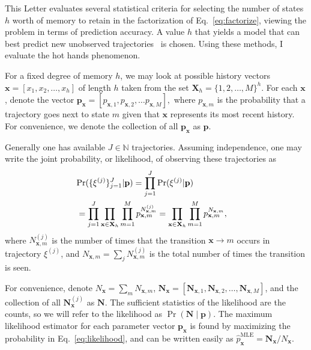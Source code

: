 \documentclass{IOS-Book-Article}
\newcommand{\bN}{\mathbf{N}}
\newcommand{\bx}{\mathbf{x}}
\newcommand{\bp}{\mathbf{p}}
\begin{document}
This Letter evaluates several statistical criteria for selecting the number of states $h$ worth of memory to retain in the factorization of Eq.~\ref{eq:factorize}, viewing the problem in terms of prediction accuracy. 
A value $h$ that yields a model that can best predict new unobserved trajectories~\cite{claeskens2008model} is chosen. Using these methods, I evaluate the hot hands phenomenon.

 For a fixed degree of memory $h$,
we may look at possible history vectors $\bx = [x_1,x_2,\ldots,x_h]$ of length $h$ taken from the set $\mathbf{X}_h = \{1,2,\ldots,M \}^h$. For each $\bx$, denote the vector $\mathbf{p}_{\bx} = [p_{\bx,1},p_{\bx,2},\ldots{p}_{\bx,M}],$ where $p_{\bx,m}$ is the probability that a trajectory goes next to state $m$ given that $\bx$ represents its most recent history. For convenience, we denote the collection of all $\bp_\bx$ as $\mathbf{p}$.  

Generally one has available  $J\in\mathbb{N}$ trajectories. Assuming independence, one may write the joint probability, or likelihood, of observing these trajectories as
\begin{align}
\lefteqn{\Pr(\{\xi^{(j)} \}_{j=1}^J \vert \bp) = \prod_{j=1}^J \Pr(\xi^{(j)}\vert \bp)  } \nonumber\\
&= \prod_{j=1}^J \prod_{\bx\in\mathbf{X}_h} \prod_{m=1}^M p_{\bx,m}^{N^{(j)}_{\bx,m}} = \prod_{\bx\in\mathbf{X}_h} \prod_{m=1}^M p_{\bx,m}^{N_{\bx,m}} ,
\label{eq:likelihood}
\end{align}
where $N^{(j)}_{\bx,m}$ is the number of times that the transition $\bx\to m$ occurs in trajectory $\xi^{(j)}$, and $N_{\bx,m} = \sum_j N^{(j)}_{\bx,m}$ is the total number of times the transition is seen.%

For convenience,  denote $N_{\bx} =\sum_{m}N_{\bx,m}$,  $\bN_{\bx}= [\bN_{\bx,1},\bN_{\bx,2},\ldots,\bN_{\bx,M}]$, and the collection of all $\bN^{(j)}_{\bx}$ as $\bN$. The sufficient statistics of the likelihood are the counts, so we will refer to the likelihood as $\Pr(\bN\mid\bp)$. The maximum likelihood estimator for each parameter vector $\bp_\bx$ is found by maximizing the probability in Eq.~\ref{eq:likelihood}, and can be written easily as
$\hat{p}^{\textrm{MLE}}_{\bx} = \mathbf{N}_{\bx} / N_{\bx}$. 
\end{document}
